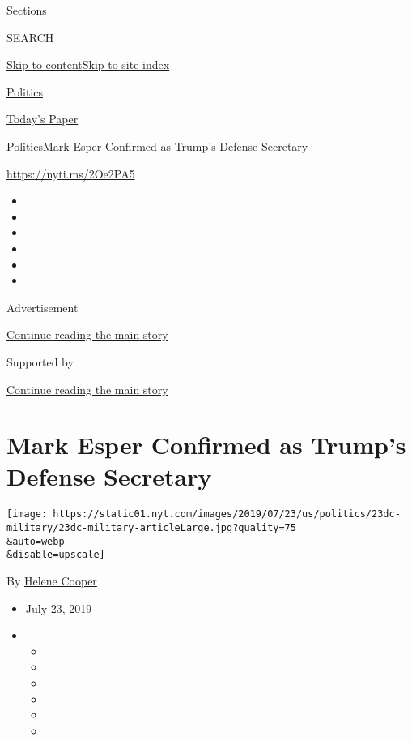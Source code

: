Sections

SEARCH

\protect\hyperlink{site-content}{Skip to
content}\protect\hyperlink{site-index}{Skip to site index}

\href{https://www.nytimes.com/section/politics}{Politics}

\href{https://myaccount.nytimes.com/auth/login?response_type=cookie\&client_id=vi}{}

\href{https://www.nytimes.com/section/todayspaper}{Today's Paper}

\href{/section/politics}{Politics}\textbar{}Mark Esper Confirmed as
Trump's Defense Secretary

\url{https://nyti.ms/2Oe2PA5}

\begin{itemize}
\item
\item
\item
\item
\item
\item
\end{itemize}

Advertisement

\protect\hyperlink{after-top}{Continue reading the main story}

Supported by

\protect\hyperlink{after-sponsor}{Continue reading the main story}

\hypertarget{mark-esper-confirmed-as-trumps-defense-secretary}{%
\section{Mark Esper Confirmed as Trump's Defense
Secretary}\label{mark-esper-confirmed-as-trumps-defense-secretary}}

\texttt{[image: https://static01.nyt.com/images/2019/07/23/us/politics/23dc-military/23dc-military-articleLarge.jpg?quality=75\\\&auto=webp\\\&disable=upscale]}

By \href{https://www.nytimes.com/by/helene-cooper}{Helene Cooper}

\begin{itemize}
\item
  July 23, 2019
\item
  \begin{itemize}
  \item
  \item
  \item
  \item
  \item
  \item
  \end{itemize}
\end{itemize}

